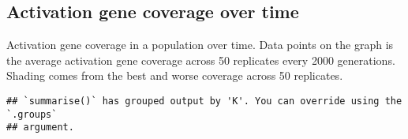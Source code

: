 \documentclass[]{book}
\newenvironment{Shaded}{\begin{snugshade}}{\end{snugshade}}
\newcommand{\DataTypeTok}[1]{\textcolor[rgb]{0.13,0.29,0.53}{#1}}
\newcommand{\KeywordTok}[1]{\textcolor[rgb]{0.13,0.29,0.53}{\textbf{#1}}}
\newcommand{\NormalTok}[1]{#1}
\newcommand{\OperatorTok}[1]{\textcolor[rgb]{0.81,0.36,0.00}{\textbf{#1}}}
\newcommand{\StringTok}[1]{\textcolor[rgb]{0.31,0.60,0.02}{#1}}
\begin{document}
\hypertarget{activation-gene-coverage-over-time-10}{%
\subsection{Activation gene coverage over time}\label{activation-gene-coverage-over-time-10}}

Activation gene coverage in a population over time.
Data points on the graph is the average activation gene coverage across 50 replicates every 2000 generations.
Shading comes from the best and worse coverage across 50 replicates.

\begin{Shaded}
\end{Shaded}

\begin{verbatim}
## `summarise()` has grouped output by 'K'. You can override using the `.groups`
## argument.
\end{verbatim}
\end{document}
